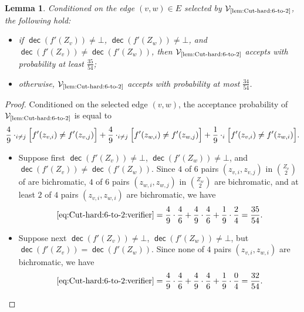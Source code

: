 \documentclass[11pt,fleqn]{article}
\DeclareMathOperator{\dec}{\mathsf{dec}}
\newcommand{\V}{\calV}
\newcommand{\f}{f}
\newcommand{\Vsix}{\V_{\text{\ref{lem:Cut-hard:6-to-2}}}}
\newcommand{\calV}{\mathcal{V}}
\let\Pr\relax\DeclareMathOperator*{\Pr}{\mathbb{P}}
\newtheorem{lemma}[theorem]{Lemma}
\theoremstyle{definition}
\numberwithin{equation}{section}
\begin{document}
\begin{lemma}
\label{lem:Cut-hard:6-to-2:verifier}
    Conditioned on the edge $(v,w) \in E$ selected by $\Vsix$,
    the following hold\textup{:}
    \begin{itemize}
        \item if
        $\dec(\f'(Z_v)) \neq \bot$,
        $\dec(\f'(Z_w)) \neq \bot$, and
        $\dec(\f'(Z_v)) \neq \dec(\f'(Z_w))$,
        then $\Vsix$ accepts with probability at least $\frac{35}{54}$\textup{;}
        \item otherwise, 
        $\Vsix$ accepts with probability at most $\frac{34}{54}$.
    \end{itemize}
\end{lemma}
\begin{proof} Conditioned on the selected edge $(v,w)$,
    the acceptance probability of $\Vsix$ is equal to
    \begin{align}
    \label{eq:Cut-hard:6-to-2:verifier}
        \frac{4}{9} \cdot \Pr_{i \neq j}\Bigl[ \f'(z_{v,i}) \neq \f'(z_{v,j}) \Bigr] +
        \frac{4}{9} \cdot \Pr_{i \neq j}\Bigl[ \f'(z_{w,i}) \neq \f'(z_{w,j}) \Bigr] +
        \frac{1}{9} \cdot \Pr_{i}\Bigl[ \f'(z_{v,i}) \neq \f'(z_{w,i}) \Bigr].
    \end{align}

\begin{itemize}
    \item 
    Suppose first
        $\dec(\f'(Z_v)) \neq \bot$,
        $\dec(\f'(Z_w)) \neq \bot$, and
        $\dec(\f'(Z_v)) \neq \dec(\f'(Z_w))$.
    Since
    $4$ of $6$ pairs $(z_{v,i}, z_{v,j})$ in ${Z_v \choose 2}$ of are bichromatic,
    $4$ of $6$ pairs $(z_{w,i}, z_{w,j})$ in ${Z_w \choose 2}$ are bichromatic, and
    at least $2$ of $4$ pairs $(z_{v,i}, z_{w,i})$ are bichromatic,
    we have
    \begin{align}
        \text{\cref{eq:Cut-hard:6-to-2:verifier}} =
        \frac{4}{9} \cdot \frac{4}{6} + \frac{4}{9} \cdot \frac{4}{6} + \frac{1}{9} \cdot \frac{2}{4}
        = \frac{35}{54}.
    \end{align}

    \item
    Suppose next
    $\dec(\f'(Z_v)) \neq \bot$,
    $\dec(\f'(Z_w)) \neq \bot$, but
    $\dec(\f'(Z_v)) = \dec(\f'(Z_w))$.
    Since none of $4$ pairs $(z_{v,i}, z_{w,i})$ are bichromatic,
    we have
    \begin{align}
        \text{\cref{eq:Cut-hard:6-to-2:verifier}} =
        \frac{4}{9} \cdot \frac{4}{6} + \frac{4}{9} \cdot \frac{4}{6} + \frac{1}{9} \cdot \frac{0}{4}
        = \frac{32}{54}.
    \end{align}


\end{itemize}
\end{proof}
\end{document}
